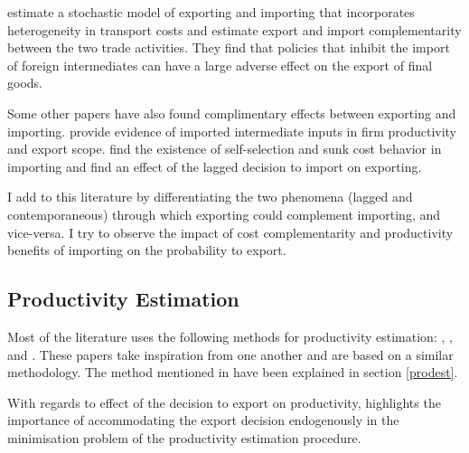 \documentclass[12pt]{article}
\begin{document}
\textcite{kasahara2013productivity} estimate a stochastic model of
exporting and importing that incorporates heterogeneity in transport
costs and estimate export and import complementarity between the two
trade activities. They find that policies that inhibit the
import of  foreign intermediates can have a large adverse 
effect on the export of final goods.  

Some other papers have also found complimentary effects between
exporting and importing. \textcite{vogel2010higher} provide evidence of imported
intermediate inputs in firm productivity and export scope. 
 \textcite{muuls2009imports} find
the existence of self-selection and sunk cost behavior in importing and
find an effect of the lagged decision to import on exporting.

I add to this literature by differentiating the two phenomena (lagged
and contemporaneous) through
which exporting could complement importing, and vice-versa. I try to observe the impact of cost
complementarity and productivity benefits of importing on the
probability to export.  
\subsection*{Productivity Estimation}
Most of the literature uses
the following methods for productivity estimation: 
\textcite{olley1992dynamics}, \textcite{levinsohn2003estimating},
\textcite{ackerberg2006structural} and \textcite{wooldridge2009estimating}. 
These papers take inspiration from one another and are based on a
similar methodology. The method
mentioned in \textcite{olley1992dynamics}
have been explained in section \ref{prodest}.

With regards to effect of the decision to export on productivity, \textcite{de2013detecting} highlights the importance of accommodating
the export decision endogenously in the minimisation problem of the productivity
estimation procedure.
\end{document}
